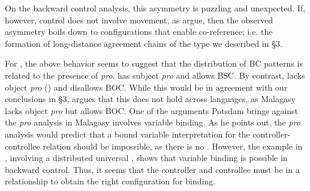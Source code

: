 \documentclass[output=paper]{langsci/langscibook}
\begin{document}
\ea%
    \label{ex:alexiadou:48}
    \z
\z
 
On the backward control analysis, this asymmetry is puzzling and unexpected. If, however, control does not involve movement, as \citet{Tsakali2017} argue, then the observed asymmetry boils down to configurations that enable co-ref\-er\-ence; i.e. the formation of long-distance agreement chains of the type we described in §3. 

For , the above behavior seems to suggest that the distribution of BC patterns is related to the presence of \textit{pro}.  has subject \textit{pro} and allows BSC. By contrast,  lacks object \textit{pro} (\citealt{Giannakidou1997}) and disallows BOC. While this would be in agreement with our conclusions in §3, \citet{Potsdam2006Backward,Potsdam2009} argues that this does not hold across languages, as Malagasy lacks object \textit{pro} but allows BOC. One of the arguments Potsdam brings against the \textit{pro} analysis in Malagasy involves variable binding. As he points out, the \textit{pro} analysis would predict that a bound variable interpretation for the controller-controllee relation should be impossible, as there is no . However, the example in , involving a distributed universal , shows that variable binding is possible in backward control. Thus, it seems that the controller and controllee must be in a  relationship to obtain the right configuration for binding. 
\end{document}

